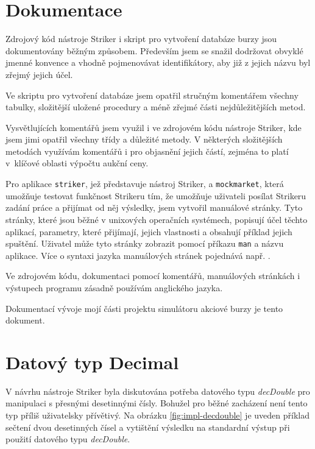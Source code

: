 \documentclass[thesis=M,czech]{FITthesis}[2012/06/26]
\begin{document}

\section{Dokumentace}

Zdrojový kód nástroje Striker i skript pro vytvoření databáze burzy jsou dokumentovány běžným způsobem. Především jsem se 
snažil dodržovat obvyklé jmenné konvence a vhodně pojmenovávat identifikátory, aby již z jejich názvu byl zřejmý jejich účel.

Ve skriptu pro vytvoření databáze jsem opatřil stručným komentářem všechny tabulky, složitější uložené procedury a méně 
zřejmé části nejdůležitějších metod.

Vysvětlujících komentářů jsem využil i ve zdrojovém kódu nástroje Striker,  kde jsem jimi opatřil všechny třídy a důležité metody. 
V některých složitějších metodách využívám komentářů i pro objasnění jejich částí, zejména to platí v~klíčové oblasti výpočtu 
aukční ceny.

Pro aplikace \texttt{striker}, jež představuje nástroj Striker, a \texttt{mockmarket}, která umožňuje testovat funkčnost Strikeru 
tím, že umožňuje uživateli posílat Strikeru zadání práce a přijímat od něj výsledky, jsem vytvořil manuálové stránky. Tyto stránky, 
které jsou běžné v unixových operačních systémech, popisují účel těchto aplikací, parametry, které přijímají, jejich vlastnosti a 
obsahují příklad jejich spuštění. Uživatel může tyto stránky zobrazit pomocí příkazu \texttt{man} a názvu aplikace. Více o syntaxi
jazyka manuálových stránek pojednává např. \cite{mandoc}.

Ve zdrojovém kódu, dokumentaci pomocí komentářů, manuálových stránkách i výstupech programu zásadně používám anglického jazyka.

Dokumentací vývoje mojí části projektu simulátoru akciové burzy je tento dokument.


\section{Datový typ Decimal}

V návrhu nástroje Striker byla diskutována potřeba datového typu \textit{decDouble} pro manipulaci s přesnými desetinnými 
čísly. Bohužel pro běžné zacházení není tento typ příliš uživatelsky přívětivý. Na obrázku \ref{fig:impl-decdouble} je uveden 
příklad sečtení dvou desetinných čísel a vytištění výsledku na standardní výstup při použití datového typu \textit{decDouble}.
\end{document}
